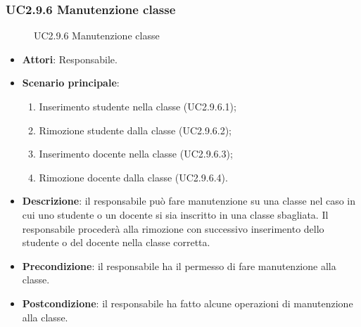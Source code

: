 \subsubsection{UC2.9.6 Manutenzione classe}
\begin{figure}[H]
\centering
\noindent{}
\caption{UC2.9.6 Manutenzione classe}
\end{figure}
\begin{itemize}
\item \textbf{Attori}: Responsabile.
\item \textbf{Scenario principale}:
\begin{enumerate}
\item Inserimento studente nella classe (UC2.9.6.1);
\item Rimozione studente dalla classe (UC2.9.6.2);
\item Inserimento docente nella classe (UC2.9.6.3);
\item Rimozione docente dalla classe (UC2.9.6.4).
\end{enumerate}
\item \textbf{Descrizione}: il responsabile può fare manutenzione su una classe nel caso in cui uno studente o un docente si sia inscritto in una classe sbagliata. Il responsabile procederà alla rimozione con successivo inserimento dello studente o del docente nella classe corretta.
\item \textbf{Precondizione}: il responsabile ha il permesso di fare manutenzione alla classe.
\item \textbf{Postcondizione}: il responsabile ha fatto alcune operazioni di manutenzione alla classe.
\end{itemize}
